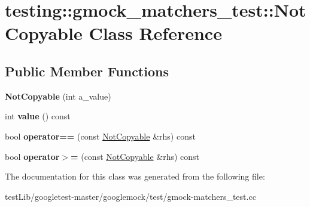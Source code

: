 \hypertarget{classtesting_1_1gmock__matchers__test_1_1NotCopyable}{}\section{testing\+:\+:gmock\+\_\+matchers\+\_\+test\+:\+:Not\+Copyable Class Reference}
\label{classtesting_1_1gmock__matchers__test_1_1NotCopyable}
\subsection*{Public Member Functions}
\begin{DoxyCompactItemize}
\item 
\mbox{\label{classtesting_1_1gmock__matchers__test_1_1NotCopyable_a3d15763c115415a26d8acc9ce5a26e19}} 
{\bfseries Not\+Copyable} (int a\+\_\+value)
\item 
\mbox{\label{classtesting_1_1gmock__matchers__test_1_1NotCopyable_af6c134767462948fa8dbd35c68370004}} 
int {\bfseries value} () const
\item 
\mbox{\label{classtesting_1_1gmock__matchers__test_1_1NotCopyable_a2e68fcd9a588a184d54e6b54e41fb978}} 
bool {\bfseries operator==} (const \hyperlink{classtesting_1_1gmock__matchers__test_1_1NotCopyable}{Not\+Copyable} \&rhs) const
\item 
\mbox{\label{classtesting_1_1gmock__matchers__test_1_1NotCopyable_a36eb6a25f5559bee00fe52a6d86b42d6}} 
bool {\bfseries operator$>$=} (const \hyperlink{classtesting_1_1gmock__matchers__test_1_1NotCopyable}{Not\+Copyable} \&rhs) const
\end{DoxyCompactItemize}


The documentation for this class was generated from the following file\+:\begin{DoxyCompactItemize}
\item 
test\+Lib/googletest-\/master/googlemock/test/gmock-\/matchers\+\_\+test.\+cc\end{DoxyCompactItemize}
